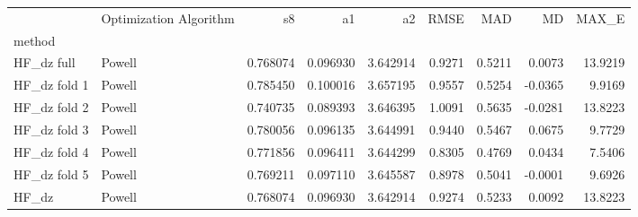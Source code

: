 \begin{tabular}{llrrrrrrr}
 & Optimization Algorithm & s8 & a1 & a2 & RMSE & MAD & MD & MAX_E \\
method &  &  &  &  &  &  &  &  \\
HF_dz full & Powell & 0.768074 & 0.096930 & 3.642914 & 0.9271 & 0.5211 & 0.0073 & 13.9219 \\
HF_dz fold 1 & Powell & 0.785450 & 0.100016 & 3.657195 & 0.9557 & 0.5254 & -0.0365 & 9.9169 \\
HF_dz fold 2 & Powell & 0.740735 & 0.089393 & 3.646395 & 1.0091 & 0.5635 & -0.0281 & 13.8223 \\
HF_dz fold 3 & Powell & 0.780056 & 0.096135 & 3.644991 & 0.9440 & 0.5467 & 0.0675 & 9.7729 \\
HF_dz fold 4 & Powell & 0.771856 & 0.096411 & 3.644299 & 0.8305 & 0.4769 & 0.0434 & 7.5406 \\
HF_dz fold 5 & Powell & 0.769211 & 0.097110 & 3.645587 & 0.8978 & 0.5041 & -0.0001 & 9.6926 \\
HF_dz & Powell & 0.768074 & 0.096930 & 3.642914 & 0.9274 & 0.5233 & 0.0092 & 13.8223 \\
\end{tabular}
